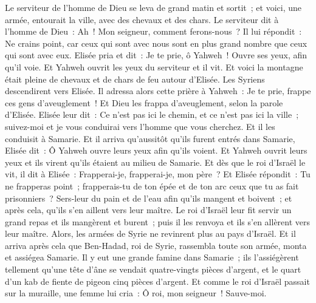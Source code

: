 \begin{multicols}{2}
Le serviteur de l'homme de Dieu se leva de grand matin et sortit~; et voici, une armée, entourait la ville, avec des chevaux et des chars. Le serviteur dit à l'homme de Dieu~: Ah~! Mon seigneur, comment ferons-nous~?
Il lui répondit~: Ne crains point, car ceux qui sont avec nous sont en plus grand nombre que ceux qui sont avec eux.
Elisée pria et dit~: Je te prie, ô Yahweh~! Ouvre ses yeux, afin qu'il voie. Et Yahweh ouvrit les yeux du serviteur et il vit. Et voici la montagne était pleine de chevaux et de chars de feu autour d'Elisée.
Les Syriens descendirent vers Elisée. Il adressa alors cette prière à Yahweh~: Je te prie, frappe ces gens d'aveuglement~! Et Dieu les frappa d'aveuglement, selon la parole d'Elisée.
Elisée leur dit~: Ce n'est pas ici le chemin, et ce n'est pas ici la ville~; suivez-moi et je vous conduirai vers l'homme que vous cherchez. Et il les conduisit à Samarie.
Et il arriva qu'aussitôt qu'ils furent entrés dans Samarie, Elisée dit~: Ô Yahweh ouvre leurs yeux afin qu'ils voient. Et Yahweh ouvrit leurs yeux et ils virent qu'ils étaient au milieu de Samarie.
Et dès que le roi d'Israël le vit, il dit à Elisée~: Frapperai-je, frapperai-je, mon père~?
Et Elisée répondit~: Tu ne frapperas point~; frapperais-tu de ton épée et de ton arc ceux que tu as fait prisonniers~? Sers-leur du pain et de l'eau afin qu'ils mangent et boivent~; et après cela, qu'ils s'en aillent vers leur maître.
Le roi d'Israël leur fit servir un grand repas et ils mangèrent et burent~; puis il les renvoya et ils s'en allèrent vers leur maître. Alors, les armées de Syrie ne revinrent plus au pays d'Israël.
Et il arriva après cela que Ben-Hadad, roi de Syrie, rassembla toute son armée, monta et assiégea Samarie.
Il y eut une grande famine dans Samarie~; ils l'assiégèrent tellement qu'une tête d'âne se vendait quatre-vingts pièces d'argent, et le quart d'un kab de fiente de pigeon cinq pièces d'argent.
Et comme le roi d'Israël passait sur la muraille, une femme lui cria~: Ô roi, mon seigneur~! Sauve-moi.

\end{multicols}
